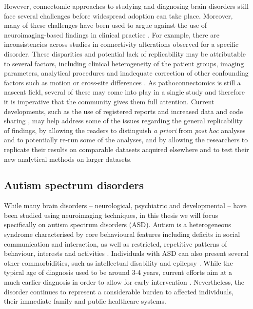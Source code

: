 However, connectomic approaches to studying and diagnosing brain disorders still
face several challenges before widespread adoption can take place. Moreover,
many of these challenges have been used to argue against the use of
neuroimaging-based findings in clinical practice \parencite{weinberger2016}. For
example, there are inconsistencies across studies in connectivity alterations
observed for a specific disorder. These disparities and potential lack of
replicability may be attributable to several factors, including clinical
heterogeneity of the patient groups, imaging parameters, analytical procedures
and inadequate correction of other confounding factors such as motion or
cross-site differences \parencite{filippi2016, marchitelli2016, power2015}. As
pathoconnectomics is still a nascent field, several of these may come into play
in a single study and therefore it is imperative that the community gives them
full attention. Current developments, such as the use of registered reports
\parencite{chambers2013} and increased data and code sharing
\parencite{poldrack2017}, may help address some of the issues regarding the
general replicability of findings, by allowing the readers to distinguish
\textit{a priori} from \textit{post hoc} analyses and to potentially re-run some
of the analyses, and by allowing the researchers to replicate their results on
comparable datasets acquired elsewhere and to test their new analytical methods
on larger datasets.

\subsection{Autism spectrum disorders}

While many brain disorders -- neurological, psychiatric and developmental --
have been studied using neuroimaging techniques, in this thesis we will focus
specifically on autism spectrum disorders (ASD). Autism is a heterogeneous
syndrome characterised by core behavioural features including deficits in social
communication and interaction, as well as restricted, repetitive patterns of
behaviour, interests and activities \parencite{association2013}. Individuals
with ASD can also present several other commorbidities, such as intellectual
disability and epilepsy \parencite{zafeiriou2007, bauman2010}. While the typical
age of diagnosis used to be around 3-4 years, current efforts aim at a
much earlier diagnosis in order to allow for early intervention
\parencite{lai2014}. Nevertheless, the disorder continues to represent a
considerable burden to affected individuals, their immediate family and public
healthcare systems. 

